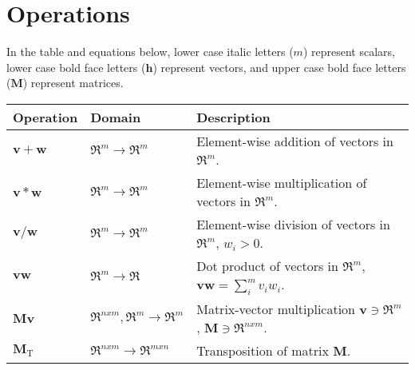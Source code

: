 
\section{Operations}
\label{sec:operations}
In the table and equations below, lower case italic letters ($m$) represent scalars, lower case bold face letters ($$) represent vectors, and upper case bold face letters ($$) represent matrices.


\begin{tabularx}{\textwidth}{|l|l|X|}
	\hline
	\bfseries{Operation} & \bfseries{Domain} & \bfseries{Description} \\ \hline
	$ + $ & $\Re^m\rightarrow\Re^m$ & Element-wise addition of vectors in $\Re^m$. \\ \hline
	$ $ & $\Re^m\rightarrow\Re^m$ & Element-wise multiplication of vectors in $\Re^m$. \\ \hline
	$ / $ & $\Re^m\rightarrow\Re^m$ & Element-wise division of vectors in $\Re^m$, $w_i>0$. \\ \hline
	$$ & $\Re^m\rightarrow\Re$ & Dot product of vectors in $\Re^m$, $=\displaystyle\sum_{i}^{m} v_iw_i$. \\ \hline
	$$ & $\Re^{nxm},\Re^m\rightarrow\Re^m$ & Matrix-vector multiplication $\ni\Re^m$, $\ni\Re^{nxm}$. \\ \hline
	$_{}$ & $\Re^{nxm}\rightarrow\Re^{mxn}$ & Transposition of matrix $$. \\ \hline
\end{tabularx}

